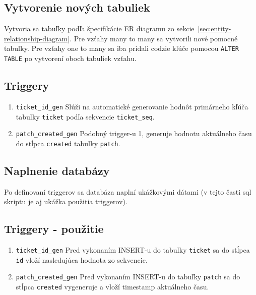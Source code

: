\documentclass[11pt, a4paper]{article}
\begin{document}
    \subsection{Vytvorenie nových tabuliek}\label{subsec:vytvorenie-nových-tabulieknull}

    Vytvoria sa tabuľky podľa špecifikácie ER diagramu zo sekcie~\ref{sec:entity-relationship-diagram}.
    Pre vzťahy many to many sa vytvorili nové pomocné tabuľky.
    Pre vzťahy one to many sa iba pridali codzie kľúče pomocou \texttt{ALTER TABLE} po vytvorení oboch tabuliek vzťahu.

    \subsection{Triggery}\label{subsec:triggery}

    \begin{enumerate}
        \item \texttt{ticket\_id\_gen}
        Slúži na automatické generovanie hodnôt primárneho kľúča tabuľky \texttt{ticket} podľa sekvencie \texttt{ticket\_seq}.
        \item \texttt{patch\_created\_gen}
        Podobný trigger-u 1, generuje hodnotu aktuálneho času do stĺpca \texttt{created} tabuľky \texttt{patch}.
    \end{enumerate}

    \subsection{Naplnenie databázy}\label{subsec:naplnenie-databázy}

    Po definovaní triggerov sa databáza naplní ukážkovými dátami (v tejto časti sql skriptu je aj ukážka použitia triggerov).

    \subsection{Triggery - použitie}\label{subsec:triggery---použitie}

    \begin{enumerate}
        \item \texttt{ticket\_id\_gen}
        Pred vykonaním INSERT-u do tabuľky \texttt{ticket} sa do stĺpca \texttt{id} vloží nasledujúca hodnota zo sekvencie.
        \item \texttt{patch\_created\_gen}
        Pred vykonaním INSERT-u do tabuľky \texttt{patch} sa do stĺpca \texttt{created} vygeneruje a vloží timestamp aktuálneho času.
    \end{enumerate}
\end{document}
